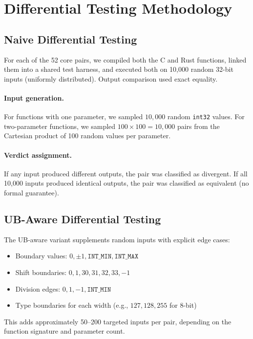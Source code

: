 \documentclass[11pt]{article}
\begin{document}
\section{Differential Testing Methodology}\label{app:difftest}

\subsection{Naive Differential Testing}

For each of the 52 core pairs, we compiled both the C and Rust functions,
linked them into a shared test harness, and executed both on 10{,}000 random
32-bit inputs (uniformly distributed).  Output comparison used exact equality.

\paragraph{Input generation.}
For functions with one parameter, we sampled $10{,}000$ random \texttt{int32}
values.  For two-parameter functions, we sampled $100 \times 100 = 10{,}000$
pairs from the Cartesian product of 100 random values per parameter.

\paragraph{Verdict assignment.}
If any input produced different outputs, the pair was classified as
divergent.  If all 10{,}000 inputs produced identical outputs, the pair was
classified as equivalent (no formal guarantee).

\subsection{UB-Aware Differential Testing}

The UB-aware variant supplements random inputs with explicit edge cases:
\begin{itemize}[nosep]
\item Boundary values: $0, \pm 1, \texttt{INT\_MIN}, \texttt{INT\_MAX}$
\item Shift boundaries: $0, 1, 30, 31, 32, 33, -1$
\item Division edges: $0, 1, -1, \texttt{INT\_MIN}$
\item Type boundaries for each width (e.g., $127, 128, 255$ for 8-bit)
\end{itemize}

This adds approximately 50--200 targeted inputs per pair, depending on the
function signature and parameter count.
\end{document}
